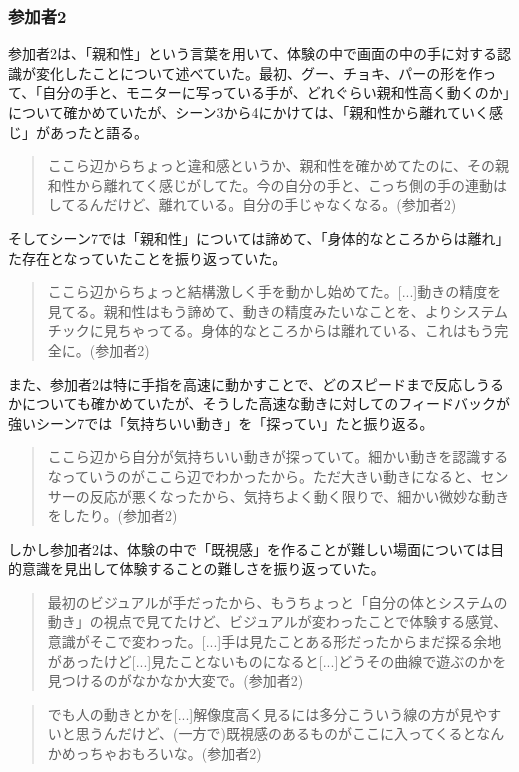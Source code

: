 \subsubsection*{参加者2}
参加者2は、「親和性」という言葉を用いて、体験の中で画面の中の手に対する認識が変化したことについて述べていた。最初、グー、チョキ、パーの形を作って、「自分の手と、モニターに写っている手が、どれぐらい親和性高く動くのか」について確かめていたが、シーン3から4にかけては、「親和性から離れていく感じ」があったと語る。
\begin{quote}
  ここら辺からちょっと違和感というか、親和性を確かめてたのに、その親和性から離れてく感じがしてた。今の自分の手と、こっち側の手の連動はしてるんだけど、離れている。自分の手じゃなくなる。(参加者2)
\end{quote}
そしてシーン7では「親和性」については諦めて、「身体的なところからは離れ」た存在となっていたことを振り返っていた。
\begin{quote}
  ここら辺からちょっと結構激しく手を動かし始めてた。[...]動きの精度を見てる。親和性はもう諦めて、動きの精度みたいなことを、よりシステムチックに見ちゃってる。身体的なところからは離れている、これはもう完全に。(参加者2)
\end{quote}

また、参加者2は特に手指を高速に動かすことで、どのスピードまで反応しうるかについても確かめていたが、そうした高速な動きに対してのフィードバックが強いシーン7では「気持ちいい動き」を「探ってい」たと振り返る。
\begin{quote}
  ここら辺から自分が気持ちいい動きが探っていて。細かい動きを認識するなっていうのがここら辺でわかったから。ただ大きい動きになると、センサーの反応が悪くなったから、気持ちよく動く限りで、細かい微妙な動きをしたり。(参加者2)
\end{quote}

しかし参加者2は、体験の中で「既視感」を作ることが難しい場面については目的意識を見出して体験することの難しさを振り返っていた。
\begin{quote}
  最初のビジュアルが手だったから、もうちょっと「自分の体とシステムの動き」の視点で見てたけど、ビジュアルが変わったことで体験する感覚、意識がそこで変わった。[...]手は見たことある形だったからまだ探る余地があったけど[...]見たことないものになると[...]どうその曲線で遊ぶのかを見つけるのがなかなか大変で。(参加者2)
\end{quote}

\begin{quote}
  でも人の動きとかを[...]解像度高く見るには多分こういう線の方が見やすいと思うんだけど、(一方で)既視感のあるものがここに入ってくるとなんかめっちゃおもろいな。(参加者2)
\end{quote}

